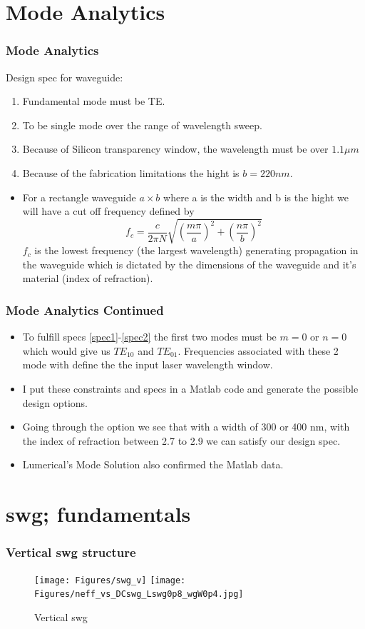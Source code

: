 \documentclass{beamer}
\begin{document}
\section{Mode Analytics} 
\begin{frame}
\frametitle{Mode Analytics}
Design spec for waveguide:
\begin{enumerate}
\item Fundamental mode must be TE.\label{spec1}
\item To be single mode over the range of wavelength sweep. \label{spec2}
\item Because of Silicon transparency window, the wavelength must be over $1.1 \mu m$
\item Because of the fabrication limitations the hight is $b=220 nm$.
\end{enumerate}
%
\begin{itemize}
\item  For a rectangle waveguide $a \times b$ where a is the width and b is the hight we will have a cut off frequency defined by
\begin{equation}
f_c =\frac{c}{2\pi N} \sqrt{(\frac{m\pi}{a})^2 +(\frac{n\pi}{b})^2}
\end{equation}
$f_c$ is the lowest frequency (the largest wavelength) generating propagation in the waveguide which is dictated by the dimensions of the waveguide and it's material (index of refraction). 
\end{itemize}
\end{frame}
%
\begin{frame}
\frametitle{Mode Analytics Continued}
\begin{itemize}
\item To fulfill specs \ref{spec1}-\ref{spec2} the first two modes must be $m=0$ or $n=0$ which would give us $TE_{10}$ and $TE_{01}$. Frequencies associated with these 2 mode with define the the input laser wavelength window.
\item I put these constraints and specs  in a Matlab code and generate the possible design options. 
\item Going through the option we see that with a width of 300 or 400 nm, with the index of refraction between 2.7 to 2.9 we can satisfy our design spec.
\item Lumerical's Mode Solution also confirmed the Matlab data.
\end{itemize}
\end{frame}
%
\section{swg; fundamentals} 
\begin{frame}
\frametitle{Vertical swg structure}
\begin{figure}[H]
\texttt{[image: Figures/swg\_v]}
\texttt{[image: Figures/neff\_vs\_DCswg\_Lswg0p8\_wgW0p4.jpg]}
\caption{\small{Vertical swg}}
\label{vSwg}
\end{figure}

\end{frame}
%
\end{document}
